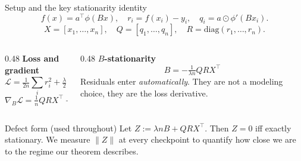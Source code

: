 \documentclass[10pt,aspectratio=169]{beamer}
\newcommand{\T}{^{\!\top}}
\begin{document}
\begin{frame}{Setup and the key stationarity identity}
  \footnotesize
  \[ f(x) = a\T \phi(Bx), \quad r_i = f(x_i) - y_i, \quad q_i = a \odot \phi'(Bx_i). \]
  \[ X = [x_1,\ldots,x_n], \quad Q = [q_1,\ldots,q_n], \quad R = \mathrm{diag}(r_1,\ldots,r_n). \]
  \vspace{-2pt}
  \begin{columns}[T,onlytextwidth]
    \begin{column}{0.48\textwidth}
      \textbf{Loss and gradient}
      \[ \mathcal{L} = \tfrac{1}{2n}\!\sum_i r_i^2 + \tfrac{\lambda}{2}\|B\|_F^2, \]
      \[ \nabla_B \mathcal{L} = \tfrac{1}{n} QRX\T + \lambda B. \]
      \vfill\null
    \end{column}
    \begin{column}{0.48\textwidth}
      \textbf{$B$-stationarity}
      \[ \boxed{\; B = -\tfrac{1}{\lambda n} QRX\T \;} \]
      Residuals enter \emph{automatically}. They are not a modeling choice, they are the loss derivative.
      \vfill\null
    \end{column}
  \end{columns}
  \vspace{6pt}
  \begin{ibox}{Defect form (used throughout)}
    Let $Z := \lambda n B + QRX\T$. Then $Z = 0$ iff exactly stationary. We measure $\|Z\|$ at every checkpoint to quantify how close we are to the regime our theorem describes.
  \end{ibox}
\end{frame}
\end{document}
